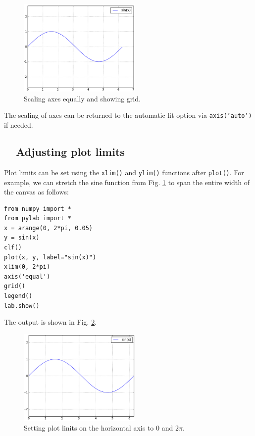 \begin{figure}[!ht]
\begin{center}
\includegraphics[width=0.53\textwidth]{imgp/plot8.png}
\end{center}
\vspace{-4mm}
\caption{Scaling axes equally and showing grid.}
\label{fig:plot8}
\vspace{-2mm}
\end{figure}
\noindent
The scaling of axes can be returned to the automatic fit option via
{\tt axis('auto')} if needed.

\subsection{\ \ Adjusting plot limits}

Plot limits can be set using the {\tt xlim()} and {\tt ylim()}
functions after {\tt plot()}. For example, we can stretch the sine
function from Fig. \ref{fig:plot8} to span the entire width of the 
canvas as follows:

\begin{verbatim}
from numpy import *
from pylab import *
x = arange(0, 2*pi, 0.05)
y = sin(x)
clf()
plot(x, y, label="sin(x)")
xlim(0, 2*pi)
axis('equal')
grid()
legend()
lab.show()
\end{verbatim}
\noindent
The output is shown in Fig. \ref{fig:plot9}.
\newpage

\begin{figure}[!ht]
\begin{center}
\includegraphics[width=0.53\textwidth]{imgp/plot9.png}
\end{center}
\vspace{-4mm}
\caption{Setting plot linits on the horizontal axis to $0$ and $2\pi$.}
\label{fig:plot9}
\vspace{-2mm}
\end{figure}
\noindent


